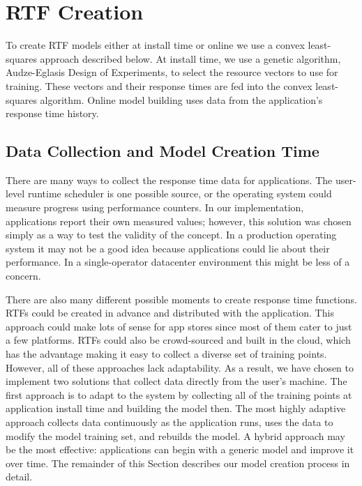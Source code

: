   
  
   
 

\section{RTF Creation}\label{rtf_creation}
To create RTF models either at install time or online we use a convex
least-squares approach described below.  At install time, we use a
genetic algorithm, Audze-Eglasis Design of
Experiments\cite{bates-aes03}, to select the resource vectors to use
for training.  These vectors and their response times are fed into the
convex least-squares algorithm. Online model building uses data
from the application's response time history.

\subsection*{Data Collection and Model Creation Time}
There are many ways to collect the response time data for
applications. The user-level runtime scheduler is one possible source,
or the operating system could measure progress using performance
counters.  In our implementation, applications report their own
measured values; however, this solution was chosen simply as a way to
test the validity of the concept.  In a production operating system it
may not be a good idea because applications could lie about their
performance.  In a single-operator datacenter environment this might be less of a concern.

There are also many different possible moments to create response time functions.  RTFs could be created in advance and distributed with the application. This approach could make lots of sense for app stores since most of them cater to just a few platforms. RTFs could also be crowd-sourced and built in the cloud, which has the advantage making it easy to collect a diverse set of training points.  However, all of these approaches lack adaptability.  As a result, we have chosen to implement two solutions that collect data directly from the user's machine.  The first approach is to adapt to the system by collecting all of the training points at application install time and building the model then.  The most highly adaptive approach collects data continuously as the application runs, uses the data to modify the model training set, and rebuilds the model.  A hybrid approach may be the most effective: applications can begin with a generic model and improve it over time. The remainder of this Section describes our model creation process in detail.

